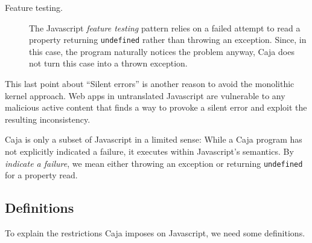 \documentclass[letterpaper,twocolumn,10pt]{article}
\newcommand{\code}[1]{{\tt {#1}}}              %
\begin{document}
\begin{description}
  \item[Feature testing.] The Javascript \emph{feature testing} pattern 
  relies on a failed attempt to read a property returning \code{undefined} 
  rather than throwing an exception. Since, in this case, the program 
  naturally notices the problem anyway, Caja does not turn this case into a 
  thrown exception.
    
\end{description}

This last point about ``Silent errors'' is another reason to avoid the 
monolithic kernel approach. Web apps in untranslated Javascript are 
vulnerable to any malicious active content that finds a way to provoke a 
silent error and exploit the resulting inconsistency.

Caja is only a subset of Javascript in a limited sense: While a Caja program 
has not explicitly indicated a failure, it executes within Javascript's 
semantics. By \emph{indicate a failure}, we mean either throwing an exception 
or returning \code{undefined} for a property read. 

\subsection{Definitions}

To explain the restrictions Caja imposes on Javascript, we need some
definitions. 
\end{document}
